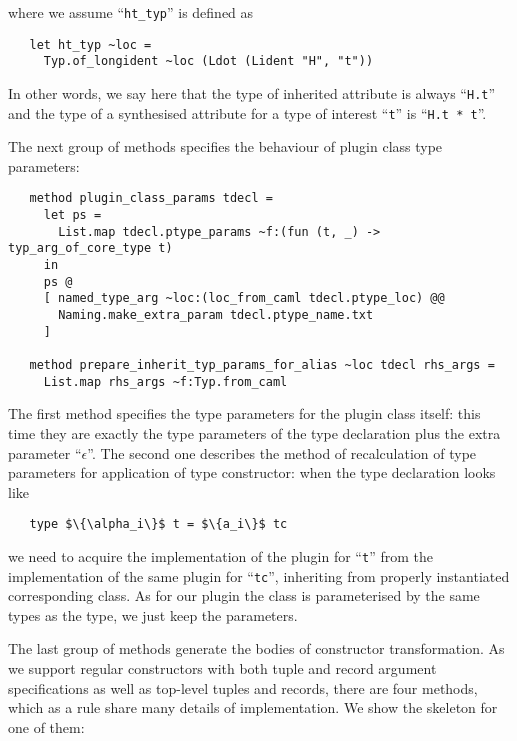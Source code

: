 where we assume ``\lstinline{ht_typ}'' is defined as

\begin{lstlisting}
   let ht_typ ~loc =
     Typ.of_longident ~loc (Ldot (Lident "H", "t"))
\end{lstlisting}

In other words, we say here that the type of inherited attribute is always ``\lstinline{H.t}'' and the type of a synthesised attribute for
a type of interest ``\lstinline{t}'' is ``\lstinline{H.t * t}''.

The next group of methods specifies the behaviour of plugin class type parameters:

\begin{lstlisting}
   method plugin_class_params tdecl =
     let ps =
       List.map tdecl.ptype_params ~f:(fun (t, _) -> typ_arg_of_core_type t)
     in
     ps @
     [ named_type_arg ~loc:(loc_from_caml tdecl.ptype_loc) @@
       Naming.make_extra_param tdecl.ptype_name.txt
     ]

   method prepare_inherit_typ_params_for_alias ~loc tdecl rhs_args =
     List.map rhs_args ~f:Typ.from_caml
\end{lstlisting}

The first method specifies the type parameters for the plugin class itself: this time they are exactly the type parameters of the type declaration plus
the extra parameter ``$\epsilon$''. The second one describes the method of recalculation of type parameters for application of type constructor: when
the type declaration looks like

\begin{lstlisting}
   type $\{\alpha_i\}$ t = $\{a_i\}$ tc
\end{lstlisting}

we need to acquire the implementation of the plugin for ``\lstinline{t}'' from the implementation of the same plugin for ``\lstinline{tc}'', inheriting
from properly instantiated corresponding class. As for our plugin the class is parameterised by the same types as the type, we just keep the parameters.

The last group of methods generate the bodies of constructor transformation. As we support regular constructors with both tuple and record
argument specifications as well as top-level tuples and records, there are four methods, which as a rule share many details of implementation. We show the
skeleton for one of them:

